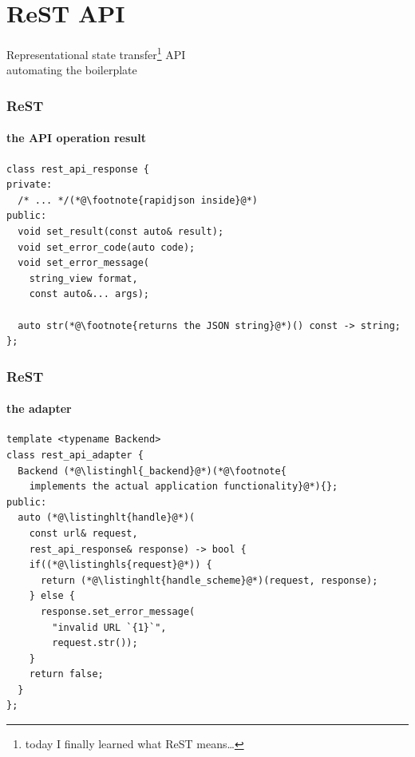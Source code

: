\documentclass[compress,table,xcolor=table]{beamer}
\begin{document}
\section{ReST API}
\begin{frame}[c]
  \Huge
  \centering
  Representational state transfer\footnote{today I finally learned what ReST means\ldots} API\\
  \Large
  automating the boilerplate
  
\end{frame}
\begin{frame}[fragile]
  \frametitle{ReST}
  \framesubtitle{the API operation result}
  \begin{lstlisting}[language=c++2x,basicstyle=\normalsize\ttfamily]
class rest_api_response {
private:
  /* ... */(*@\footnote{rapidjson inside}@*)
public:
  void set_result(const auto& result);
  void set_error_code(auto code);
  void set_error_message(
    string_view format,
    const auto&... args);

  auto str(*@\footnote{returns the JSON string}@*)() const -> string;
};
  \end{lstlisting}
\end{frame}
\begin{frame}[fragile]
  \frametitle{ReST}
  \framesubtitle{the adapter}
  \begin{lstlisting}[language=c++2x,basicstyle=\small\ttfamily]
template <typename Backend>
class rest_api_adapter {
  Backend (*@\listinghl{_backend}@*)(*@\footnote{
    implements the actual application functionality}@*){};
public:
  auto (*@\listinghlt{handle}@*)(
    const url& request,
    rest_api_response& response) -> bool {
    if((*@\listinghls{request}@*)) {
      return (*@\listinghlt{handle_scheme}@*)(request, response);
    } else {
      response.set_error_message(
        "invalid URL `{1}`",
        request.str());
    }
    return false;
  }
};
  \end{lstlisting}
\end{frame}
\end{document}
